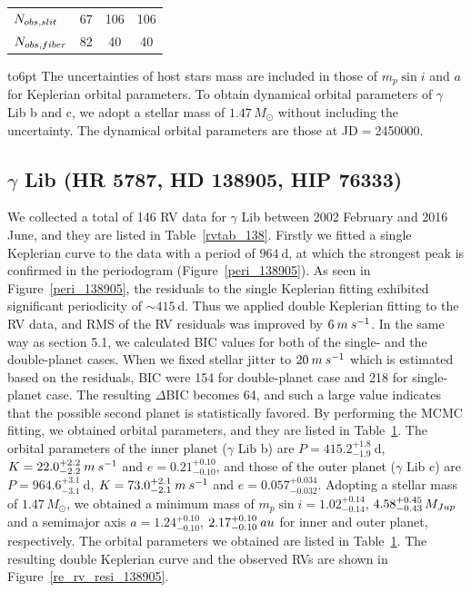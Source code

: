 \documentclass[]{pasj01}
\begin{document}
\begin{table}
{\begin{tabular}{lccccc}
${N}_{\rm obs, slit}$ 			& 67 							& \multicolumn{2}{c}{106} & \multicolumn{2}{c}{106}\\
${N}_{\rm obs, fiber}$ 		& 82 							& \multicolumn{2}{c}{40} & \multicolumn{2}{c}{40}\\\hline
 \end{tabular}}
 \begin{tabnote}
\noindent
 \hbox to6pt{\footnotemark[$*$]\hss}\unskip%
The uncertainties of host stars mass are included in those of $m_p\sin{i}$ and $a$ for Keplerian orbital parameters. 
To obtain dynamical orbital parameters of $\gamma$ Lib b and c, we adopt a stellar mass of $1.47\,M_{\odot}$ without including the uncertainty.
The dynamical orbital parameters are those at JD$=$2450000.
\end{tabnote}
\label{dtab2}
\end{table}

\subsection{$\gamma$ Lib (HR 5787, HD 138905, HIP 76333)}\label{res_gamma}
We collected a total of 146 RV data for $\gamma$ Lib between 2002 February and 2016 June, and they are listed in Table~\ref{rvtab_138}.
Firstly we fitted a single Keplerian curve to the data with a period of $964\>$d, at which the strongest peak is confirmed in the periodogram (Figure~\ref{peri_138905}).
As seen in Figure~\ref{peri_138905}, the residuals to the single Keplerian fitting exhibited significant periodicity of $\sim415\>$d.
Thus we applied double Keplerian fitting to the RV data, and RMS of the RV residuals was improved by $6\>{\rm m\>s^{-1}}$.
In the same way as section 5.1, we calculated BIC values for both of the single- and the double-planet cases.
When we fixed stellar jitter to $20\>{\rm m\>s^{-1}}$ which is estimated based on the residuals, BIC were 154 for double-planet case and 218 for single-planet case.
The resulting $\Delta$BIC becomes 64, and such a large value indicates that the possible second planet is statistically favored.
By performing the MCMC fitting, we obtained orbital parameters, and they are listed in Table~\ref{dtab2}.
The orbital parameters of the inner planet ($\gamma$ Lib b) are $P= 415.2_{-1.9}^{+1.8}\>$d, $K = 22.0_{-2.2}^{+2.2}\>{\rm m\>s^{-1}}$ and $e=0.21_{-0.10}^{+0.10}$, and those of the outer planet ($\gamma$ Lib c) are $P= 964.6_{-3.1}^{+3.1}\>$d, $K=73.0_{-2.1}^{+2.1}\>{\rm m\>s^{-1}}$ and $e=0.057_{-0.032}^{+0.034}$.
Adopting a stellar mass of $1.47\,M_{\odot}$, we obtained a minimum mass of $m_p\sin{i}=1.02_{-0.14}^{+0.14}$, $4.58_{-0.43}^{+0.45}\,M_{\rm Jup}$ and a semimajor axis $a=1.24_{-0.10}^{+0.10}$, $2.17_{-0.10}^{+0.10}\>{\rm au}$ for inner and outer planet, respectively.
The orbital parameters we obtained are listed in Table~\ref{dtab2}.
The resulting double Keplerian curve and the observed RVs are shown in Figure~\ref{re_rv_resi_138905}.
\end{document}
